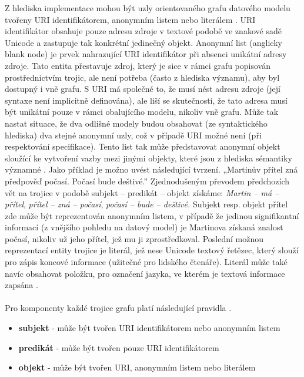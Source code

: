 \documentclass{projekt}
\begin{document}
Z hlediska implementace mohou být uzly orientovaného grafu datového modelu tvořeny URI identifikátorem, anonymním listem nebo literálem \cite{_6}. URI identifikátor obsahuje pouze adresu zdroje v textové podobě ve znakové sadě Unicode a zastupuje tak konkrétní jedinečný objekt. Anonymní list (anglicky blank node) je prvek nahrazující URI identifikátor při absenci unikátní adresy zdroje. Tato entita přestavuje zdroj, který je sice v rámci grafu popisován prostřednictvím trojic, ale není potřeba (často z hlediska významu), aby byl dostupný i vně grafu. S URI má společné to, že musí nést adresu zdroje (její syntaxe není implicitně definována), ale liší se skutečností, že tato adresa musí být unikátní pouze v rámci obalujícího modelu, nikoliv vně grafu. Může tak nastat situace, že dva odlišné modely budou obsahovat (ze syntaktického hlediska) dva stejné anonymní uzly, což v případě URI možné není (při respektování specifikace). Tento list tak může představovat anonymní objekt sloužící ke vytvoření vazby mezi jinými objekty, které jsou z hlediska sémantiky významné \cite{_5}. Jako příklad je možno uvést následující tvrzení. „Martinův přítel zná předpověď počasí. Počasí bude deštivé.” Zjednodušeným převodem předchozích vět na trojice v podobě subjekt – predikát – objekt získáme: {\it Martin – má – přítel}, {\it přítel – zná – počasí},  {\it počasí – bude – deštivé.} 
Subjekt resp. objekt přítel zde může být reprezentován anonymním listem, v případě že jedinou signifikantní informací (z vnějšího pohledu na datový model) je Martinova získaná znalost počasí, nikoliv už jeho přítel, jež mu ji zprostředkoval. 
Poslední možnou reprezentací entity trojice je literál, jež nese Unicode textový řetězec, který slouží pro zápis koncové informace (užitečné pro lidského čtenáře). Literál může také navíc obsahovat položku, pro označení jazyka, ve kterém je textová informace zapsána \cite{_34}. 
\\
\\
Pro komponenty každé trojice grafu platí následující pravidla \cite{_6}.

\begin {itemize}

\item \textbf{subjekt} - může být tvořen URI identifikátorem nebo anonymním listem
\item \textbf{predikát} - může být tvořen pouze URI identifikátorem
\item \textbf{objekt} - může být tvořen URI, anonymním listem nebo literálem

\end{itemize}
\end{document}
